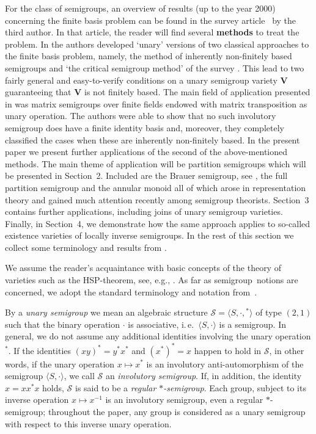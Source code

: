 \documentclass[11pt,reqno]{amsart}
\numberwithin{equation}{section}
\theoremstyle{remark}
\def\sm{semi\-group}
\begin{document}
For the class of semigroups, an overview of results (up to the
year 2000) concerning the finite basis problem can be found in the
survey article~\cite{volkovjaponicae} by the third author. In that
article, the reader will find several \textbf{methods} to treat
the problem.  In \cite{adv} the authors developed `unary' versions
of two classical approaches to the finite basis problem, namely, the method of
inherently non-finitely based semigroups and `the critical
semigroup method' of the survey \cite{volkovjaponicae}. This lead
to two fairly general and easy-to-verify conditions on a unary
semigroup variety $\mathbf{V}$ guaranteeing that $\mathbf{V}$ is
not finitely based. The main field of application presented in \cite{adv}
was matrix semigroups over finite fields endowed with matrix transposition as unary operation. The authors were able to show that no such involutory semigroup does have a finite identity basis and, moreover, they completely classified the cases when these are inherently non-finitely based. In the present paper we present further applications of the second of the above-mentioned methods. The main theme of application will be partition semigroups which will be presented in  Section~2. Included are the Brauer
semigroup, see \cite{brauer}, the full partition semigroup and the annular monoid all of which arose in representation theory and gained much attention recently among semigroup theorists. Section~3 contains further applications, including joins of unary semigroup varieties. Finally, in Section~4, we demonstrate how the same approach applies to so-called existence
varieties of locally inverse semigroups. In the rest of this section we collect some terminology and results from \cite{adv}.

We assume the reader's acquaintance with basic concepts of the
theory of varieties such as the HSP-theorem, see, e.g.,
\cite[Chapter~II]{BuSa81}. As far as \sm\ notions are concerned,
we adopt the standard terminology and notation from~\cite{CP}. 

By a \emph{unary semigroup} we mean an algebraic
structure
 $\mathcal{S}=\langle S,\cdot,{}^*\rangle$ of type $(2,1)$ such that
the binary operation $\cdot$ is associative, i.\,e.\ $\langle
S,\cdot\rangle$ is a semigroup. In general, we do not assume any
additional identities involving the unary operation ${}^*$. If the
identities $(xy)^* = y^*x^*$ and $(x^*)^* = x$ happen to hold in
$\mathcal{S}$, in other words, if the unary operation $x\mapsto
x^*$ is an involutory anti-automorphism of the semigroup $\langle
S,\cdot\rangle$, we call $\mathcal{S}$ an \emph{involutory
semigroup}. If, in addition, the identity $x=xx^*x$ holds,
$\mathcal{S}$ is said to be a \emph{regular $*$-semigroup}. Each
group, subject to its inverse operation $x\mapsto x^{-1}$ is an
involutory semigroup, even a regular $*$-semigroup; throughout the
paper, any group is considered as a unary semigroup with respect
to this inverse unary operation.
\end{document}
